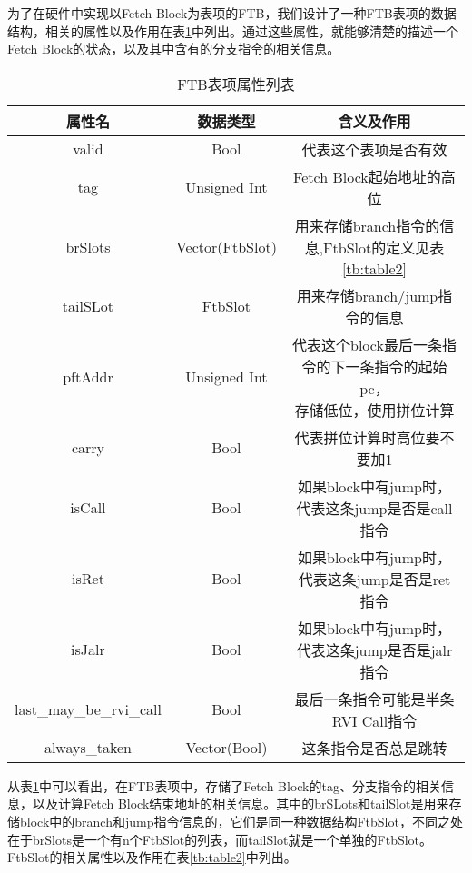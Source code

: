
为了在硬件中实现以Fetch Block为表项的FTB，我们设计了一种FTB表项的数据结构，相关的属性以及作用在表\ref{tb:table1}中列出。通过这些属性，就能够清楚的描述一个Fetch Block的状态，以及其中含有的分支指令的相关信息。

\begin{table}[]
	\caption{FTB表项属性列表}
	\label{tb:table1}
	\centering
	\begin{tabular}{|c|c|c|}
		\hline
		属性名   & 数据类型   & 含义及作用   \\ \hline
		valid & Bool & 代表这个表项是否有效 \\ \hline
		tag & Unsigned Int & Fetch Block起始地址的高位 \\ \hline
		brSlots & Vector(FtbSlot) & 用来存储branch指令的信息,FtbSlot的定义见表\ref{tb:table2} \\ \hline
		tailSLot & FtbSlot & 用来存储branch/jump指令的信息 \\ \hline
		pftAddr & Unsigned Int & \tabincell{c}{代表这个block最后一条指令的下一条指令的起始pc， \\ 存储低位，使用拼位计算} \\ \hline
		carry & Bool & 代表拼位计算时高位要不要加1 \\ \hline
		isCall & Bool & 如果block中有jump时，代表这条jump是否是call指令 \\ \hline
		isRet & Bool & 如果block中有jump时，代表这条jump是否是ret指令 \\ \hline
		isJalr & Bool & 如果block中有jump时，代表这条jump是否是jalr指令 \\ \hline
		last\_may\_be\_rvi\_call & Bool & 最后一条指令可能是半条RVI Call指令 \\ \hline
		always\_taken & Vector(Bool) & 这条指令是否总是跳转 \\ \hline
	\end{tabular}
\end{table}

从表\ref{tb:table1}中可以看出，在FTB表项中，存储了Fetch Block的tag、分支指令的相关信息，以及计算Fetch Block结束地址的相关信息。其中的brSLots和tailSlot是用来存储block中的branch和jump指令信息的，它们是同一种数据结构FtbSlot，不同之处在于brSlots是一个有n个FtbSlot的列表，而tailSlot就是一个单独的FtbSlot。FtbSlot的相关属性以及作用在表\ref{tb:table2}中列出。


